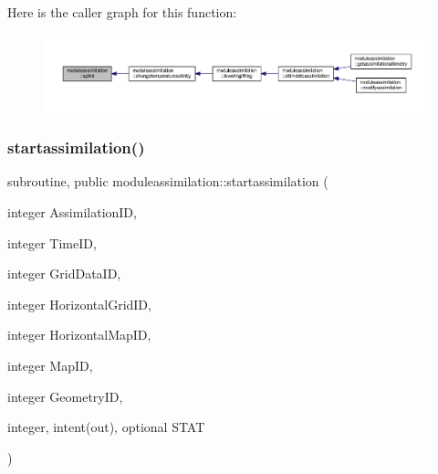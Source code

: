 Here is the caller graph for this function\+:\nopagebreak
\begin{figure}[H]
\begin{center}
\leavevmode
\includegraphics[width=350pt]{namespacemoduleassimilation_a5db3c59220db22267e7e1e7eca84a356_icgraph}
\end{center}
\end{figure}
\mbox{\label{namespacemoduleassimilation_a686ae542667f0f0269fb4baa108cbcf7}} 
\subsubsection{\texorpdfstring{startassimilation()}{startassimilation()}}
{\footnotesize\ttfamily subroutine, public moduleassimilation\+::startassimilation (\begin{DoxyParamCaption}\item[{integer}]{Assimilation\+ID,  }\item[{integer}]{Time\+ID,  }\item[{integer}]{Grid\+Data\+ID,  }\item[{integer}]{Horizontal\+Grid\+ID,  }\item[{integer}]{Horizontal\+Map\+ID,  }\item[{integer}]{Map\+ID,  }\item[{integer}]{Geometry\+ID,  }\item[{integer, intent(out), optional}]{S\+T\+AT }\end{DoxyParamCaption})}

